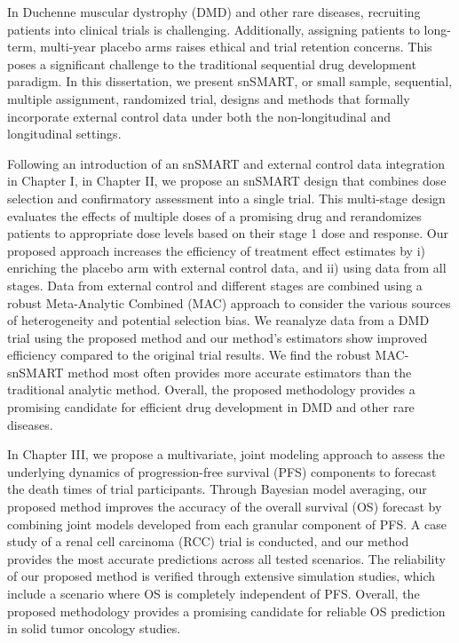 In Duchenne muscular dystrophy (DMD) and other rare diseases, recruiting patients into clinical trials is challenging. Additionally, assigning patients to long-term, multi-year placebo arms raises ethical and trial retention concerns. This poses a significant challenge to the traditional sequential drug development paradigm. In this dissertation, we present snSMART, or small sample, sequential, multiple assignment, randomized trial, designs and methods that formally incorporate external control data under both the non-longitudinal and longitudinal settings.

Following an introduction of an snSMART and external control data integration in Chapter I, in Chapter II, we propose an snSMART design that combines dose selection and confirmatory assessment into a single trial. This multi-stage design evaluates the effects of multiple doses of a promising drug and rerandomizes patients to appropriate dose levels based on their stage 1 dose and response. Our proposed approach increases the efficiency of treatment effect estimates by i) enriching the placebo arm with external control data, and ii) using data from all stages. Data from external control and different stages are combined using a robust Meta-Analytic Combined (MAC) approach to consider the various sources of heterogeneity and potential selection bias. We reanalyze data from a DMD trial using the proposed method and our method's estimators show improved efficiency compared to the original trial results. We find the robust MAC-snSMART method most often provides more accurate estimators than the traditional analytic method. Overall, the proposed methodology provides a promising candidate for efficient drug development in DMD and other rare diseases.

In Chapter III, we propose a multivariate, joint modeling approach to assess the underlying dynamics of progression-free survival (PFS) components to forecast the death times of trial participants. Through Bayesian model averaging, our proposed method improves the accuracy of the overall survival (OS) forecast by combining joint models developed from each granular component of PFS. A case study of a renal cell carcinoma (RCC) trial is conducted, and our method provides the most accurate predictions across all tested scenarios. The reliability of our proposed method is verified through extensive simulation studies, which include a scenario where OS is completely independent of PFS. Overall, the proposed methodology provides a promising candidate for reliable OS prediction in solid tumor oncology studies.


